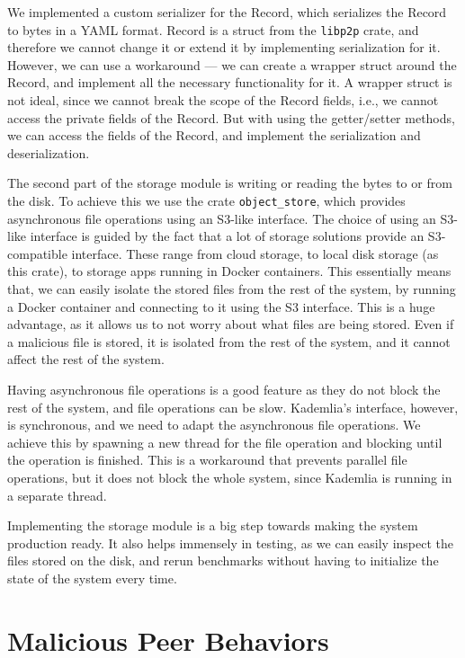 We implemented a custom serializer for the Record,
which serializes the Record to bytes in a YAML format.
Record is a struct from the \texttt{libp2p} crate,
and therefore we cannot change it or extend it by implementing serialization for it.
However, we can use a workaround --- we can create a wrapper struct around the Record,
and implement all the necessary functionality for it.
A wrapper struct is not ideal, since we cannot break the scope of the Record fields,
i.e., we cannot access the private fields of the Record.
But with using the getter/setter methods, we can access the fields of the Record,
and implement the serialization and deserialization.

The second part of the storage module is writing or reading the bytes to or from the disk.
To achieve this we use the crate \texttt{object\_store}, which provides
asynchronous file operations using an S3-like interface.
The choice of using an S3-like interface is guided by the fact that a lot of
storage solutions provide an S3-compatible interface.
These range from cloud storage, to local disk storage (as this crate), to storage apps
running in Docker containers.
This essentially means that, we can easily isolate the stored files from the rest of the system,
by running a Docker container and connecting to it using the S3 interface.
This is a huge advantage, as it allows us to not worry about what files are being stored.
Even if a malicious file is stored, it is isolated from the rest of the system,
and it cannot affect the rest of the system.

Having asynchronous file operations is a good feature as they do not block the rest of the system,
and file operations can be slow.
Kademlia's interface, however, is synchronous, and we need to adapt the asynchronous file operations.
We achieve this by spawning a new thread for the file operation and blocking
until the operation is finished.
This is a workaround that prevents parallel file operations,
but it does not block the whole system, since Kademlia is running in a separate thread.

Implementing the storage module is a big step towards making the system production ready.
It also helps immensely in testing, as we can easily inspect the files stored on the disk,
and rerun benchmarks without having to initialize the state of the system every time.

\section{Malicious Peer Behaviors}

